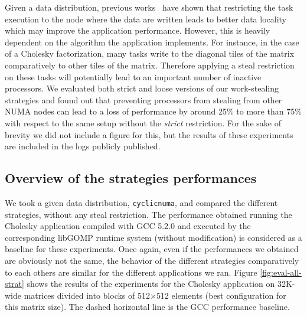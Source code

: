\documentclass{Styles/llncs}
\begin{document}
Given a data distribution, previous works~\cite{Olivier:2012:CMW:2388996.2389085}
have shown that restricting the task execution to the node where the data are
written leads to better data locality which may improve the application performance.
However, this is heavily dependent on the algorithm the application implements. For instance, in the case
of a Cholesky factorization, many tasks write to the diagonal tiles
of the matrix comparatively to other tiles of the matrix. Therefore applying
a steal restriction on these tasks will potentially lead to an important number
of inactive processors.
We evaluated both strict and loose versions of our work-stealing strategies and found
out that preventing processors from stealing from other NUMA nodes can lead to a loss of performance by
around 25\% to more than 75\% with respect to the same setup without the \emph{strict}
restriction.
For the sake of brevity we did not include a figure for this, but the results of these
experiments are included in the logs publicly published.



\subsection{Overview of the strategies performances}

We took a given data distribution, \verb/cyclicnuma/, and compared the different strategies, without any steal restriction.
The performance obtained running the Cholesky application compiled with GCC 5.2.0 and executed by the corresponding libGOMP runtime system (without modification) is considered as a baseline for these experiments.
Once again, even if the performances we obtained are obviously not the same, the behavior of the different strategies comparatively to each others are similar for the different applications we ran.
Figure \ref{fig:eval-all-strat} shows the results of the experiments for the
Cholesky application on 32K-wide matrices divided into blocks of 512$\times$512 elements (best configuration for this matrix size).
The dashed horizontal line is the GCC performance baseline.
\end{document}
